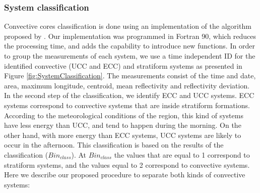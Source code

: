 \documentclass[preprint,12pt]{elsarticle}
\begin{document}
\subsubsection*{System classification}

Convective cores classification is done using an implementation of the algorithm proposed by \citep{Steiner1995}.  Our implementation was programmed in Fortran 90, which reduces the processing time, and adds the capability to introduce new functions.  In order to group the measurements of each system, we use a time independent ID for the identified convective (UCC and ECC) and stratiform systems as presented in Figure \ref{fig:SystemClassification}.  The measurements consist of the time and date,  area, maximum longitude, centroid, mean reflectivity and reflectivity deviation.\\      

In the second step of the classification, we identify ECC and UCC systems.  ECC systems correspond to convective systems that are inside stratiform formations.  According to the meteorological conditions of the region, this kind of systems have less energy than UCC, and tend to happen during the morning.  On the other hand, with more energy than ECC systems, UCC systems are likely to occur in the afternoon. This classification is based on the results of the \citet{Steiner1995} classification ($Bin_{class}$).  At $Bin_{class}$ the values that are equal to 1 correspond to stratiform systems, and the values equal to 2 correspond to convective systems. Here we describe our proposed procedure to separate both kinds of convective systems:\\
\end{document}
